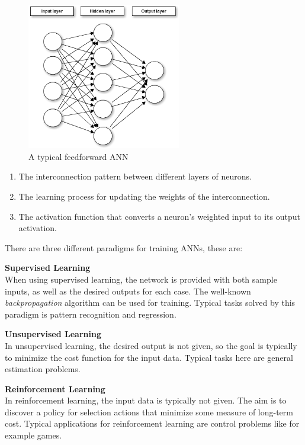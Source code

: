 \documentclass[12pt]{article}
\begin{document}
	\begin{figure}[h]
		\centering
		\includegraphics[width = 0.6\textwidth]{ann}
		\caption{A typical feedforward ANN}
		\label{fig:ann}
	\end{figure}
	
	\begin{enumerate}
		\item The interconnection pattern between different layers of neurons.
		\item The learning process for updating the weights of the interconnection.
		\item The activation function that converts a neuron's weighted input to its output activation.
	\end{enumerate}
	
	There are three different paradigms for training ANNs, these are:
	
	\begin{description}
		\item \textbf{Supervised Learning} \hfill \\
		When using supervised learning, the network is provided with both sample inputs, as well as the desired outputs for each case. The well-known \textit{backpropagation} algorithm can be used for training. Typical tasks solved by this paradigm is pattern recognition and regression. 
		\item \textbf{Unsupervised Learning} \hfill \\
		In unsupervised learning, the desired output is not given, so the goal is typically to minimize the cost function for the input data. Typical tasks here are general estimation problems.
		\item \textbf{Reinforcement Learning} \hfill \\
		In reinforcement learning, the input data is typically not given. The aim is to discover a policy for selection actions that minimize some measure of long-term cost. Typical applications for reinforcement learning are control problems like for example games. 
	\end{description}
	
\end{document}
